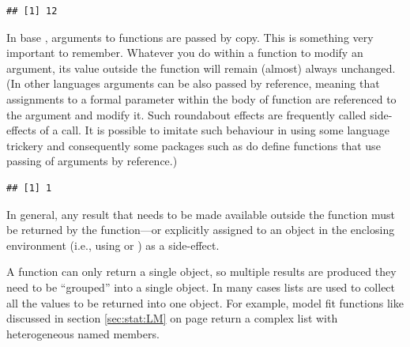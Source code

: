 \documentclass[krantz2]{krantz}\usepackage{knitr}%
\begin{document}
\begin{knitrout}\footnotesize
{}\color{fgcolor}\begin{kframe}
\begin{alltt}
 \hlkwb{<-} \hlstd{(}\hlstd{,}  \hlopt{*} 
\hlstd{(}\hlstd{,} \hlstd{)}
\end{alltt}
\begin{verbatim}
## [1] 12
\end{verbatim}
\end{kframe}
\end{knitrout}

\begin{warningbox}
In base \Rlang, arguments to functions are passed by copy. This is something very important to remember. Whatever you do within a function to modify an argument, its value outside the function will remain (almost) always unchanged. (In other languages arguments can be also passed by reference, meaning that assignments to a formal parameter within the body of function are referenced to the argument and modify it. Such roundabout effects are frequently called side-effects of a call. It is possible to imitate such behaviour in \Rlang using some language trickery and consequently some packages such as  do define functions that use passing of arguments by reference.)

\begin{knitrout}\footnotesize
{}\color{fgcolor}\begin{kframe}
\begin{alltt}
 \hlkwb{<-} \hlstd{(} \hlkwb{<-} \hlstd{\}}
 \hlkwb{<-} 
\end{alltt}
\begin{verbatim}
## [1] 1
\end{verbatim}
\end{kframe}
\end{knitrout}

In general, any result that needs to be made available outside the function must be returned by the function---or explicitly assigned to an object in the enclosing environment (i.e., using \Roperator{<<-} or ) as a side-effect.

A function can only return a single object, so multiple results are produced they need to be ``grouped'' into a single object. In many cases lists are used to collect all the values to be returned into one object. For example, model fit functions like  discussed in section \ref{sec:stat:LM} on page \pageref{sec:stat:LM} return a complex list with heterogeneous named members.
\end{warningbox}
\end{document}
